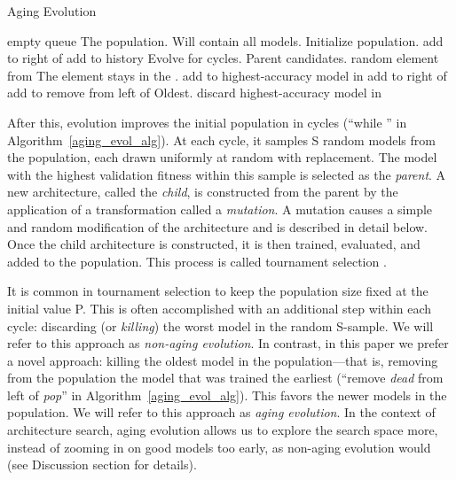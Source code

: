 \documentclass[letterpaper]{article} \usepackage{aaai19}  \usepackage{times}  \usepackage{helvet}  \usepackage{courier}  \usepackage{graphicx}  \frenchspacing
\begin{document}
\begin{algorithm}
\caption{Aging Evolution}
\label{aging_evol_alg}
\begin{algorithmic}
\State  empty queue  \Comment The population.
\State   \Comment Will contain all models.
\While{}  \Comment Initialize population.
    \State 
    \State 
    \State add  to right of 
    \State add  to history
\EndWhile
\While{}  \Comment Evolve for  cycles.
    \State   \Comment Parent candidates.
    \While{}
        \State  random element from 
        \State \Comment The element stays in the .
        \State add  to 
    \EndWhile
    \State  highest-accuracy model in 
    \State 
    \State 
    \State add  to right of 
    \State add  to 
    \State remove  from left of   \Comment Oldest.
    \State discard 
\EndWhile
\State \Return highest-accuracy model in 
\end{algorithmic}
\end{algorithm}

After this, evolution improves the initial population in cycles (``{while }'' in Algorithm~\ref{aging_evol_alg}). At each cycle, it samples S random models from the population, each drawn uniformly at random with replacement. The model with the highest validation fitness within this sample is selected as the \textit{parent}. A new architecture, called the \textit{child}, is constructed from the parent by the application of a transformation called a \textit{mutation}. A mutation causes a simple and random modification of the architecture and is described in detail below. Once the child architecture is constructed, it is then trained, evaluated, and added to the population. This process is called tournament selection \cite{goldberg1991comparative}.

It is common in tournament selection to keep the population size fixed at the initial value P. This is often accomplished with an additional step within each cycle: discarding (or \textit{killing}) the worst model in the random S-sample. We will refer to this approach as \textit{non-aging evolution}. In contrast, in this paper we prefer a novel approach: killing the oldest model in the population---that is, removing from the population the model that was trained the earliest (``{remove \textit{dead} from left of \textit{pop}}'' in Algorithm~\ref{aging_evol_alg}). This favors the newer models in the population. We will refer to this approach as \textit{aging evolution}. In the context of architecture search, aging evolution allows us to explore the search space more, instead of zooming in on good models too early, as non-aging evolution would (see Discussion section for details).
\end{document}
